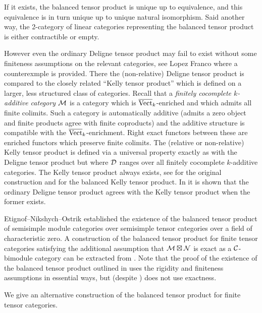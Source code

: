 \documentclass{amsart}
\begin{document}
If it exists, the balanced tensor product is unique up to equivalence, and this equivalence is in turn unique up to unique natural isomorphism. Said another way, the 2-category of linear categories representing the balanced tensor product is either contractible or empty. 

However even the ordinary Deligne tensor product may fail to exist without some finiteness assumptions on the relevant categories, see Lopez Franco \cite{1212.1545} where a counterexmple is provided. There the (non-relative) Deligne tensor product is compared to the closely related ``Kelly tensor product'' which is defined on a larger, less structured class of categories. Recall that a \emph{finitely cocomplete $k$-additive category $\mathcal M$} is a category which is $\overline{\mathrm{Vect}}_k$-enriched and which admits all finite colimits. Such a category is automatically additive (admits a zero object and finite products agree with finite coproducts) and the additive structure is compatible with the $\overline{\mathrm{Vect}}_k$-enrichment. Right exact functors between these are enriched functors which preserve finite colimits. The (relative or non-relative) Kelly tensor product is defined via a universal property exactly as with the Deligne tensor product but where $\mathcal D$ ranges over all finitely cocomplete $k$-additive categories. The Kelly tensor product always exists, see \cite{MR651714, MR648793} for the original construction and \cite[Rmk~3.21]{1501.04652} for the balanced Kelly tensor product. In \cite{1212.1545} it is shown that the ordinary Deligne tensor product agrees with the Kelly tensor product when the former exists. 


Etignof--Nikshych--Ostrik \cite{0909.3140} established the existence of the balanced tensor product of semisimple module categories over semisimple tensor categories over a field of characteristic zero.  A construction of the balanced tensor product for finite tensor categories satisfying the additional assumption that $\mathcal M \boxtimes \mathcal N$ is exact as a $\mathcal C$-bimodule category can be extracted from \cite[Thm 3.1]{1102.3411}.  Note that the proof of the existence of the balanced tensor product outlined in \cite{MR3107567} uses the rigidity and finiteness assumptions in essential ways, but (despite \cite[Note 2.7]{MR3107567}) does not use exactness.  

We give an alternative construction of the balanced tensor product for finite tensor categories.
\end{document}
